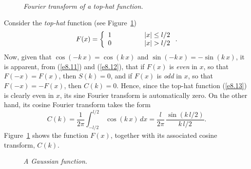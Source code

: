 \begin{figure}
\epsfysize=2.2in
\centerline{}
\caption{\em Fourier transform of a top-hat function.}\label{f8.1}   
\end{figure}

Consider the {\em top-hat}\/ function (see Figure~\ref{f8.1})
\begin{equation}\label{e8.13}
F(x)=\left\{
\begin{array}{ccc}
1 &\mbox{\hspace{1cm}}& |x|\leq l/2\\
0 && |x|>l/2
\end{array}\right..
\end{equation}
Now, given that $\cos(-k\,x)=\cos(k\,x)$ and $\sin(-k\,x)=-\sin(k\,x)$, it is
apparent, from (\ref{e8.11}) and (\ref{e8.12}), that if $F(x)$ is {\em even}\/ in $x$, so that $F(-x)=F(x)$, then $S(k)=0$, and
if $F(x)$ is {\em odd}\/ in $x$, so that $F(-x)=-F(x)$, then $C(k)=0$. Hence, since the top-hat function (\ref{e8.13})
is clearly even in $x$, its sine Fourier transform is automatically zero. On the other hand,
its cosine Fourier transform takes the form
\begin{equation}
C(k) = \frac{1}{2\pi}\int_{-l/2}^{l/2}\,\cos(k\, x)\,dx = \frac{l}{2\pi}\,\frac{\sin(k\,l/2)}{k\,l/2}.
\end{equation}
Figure~\ref{f8.1} shows the function $F(x)$, together with its associated cosine transform, $C(k)$. 

\begin{figure}
\epsfysize=2.5in
\centerline{}
\caption{\em A Gaussian function.}\label{f8.2}   
\end{figure}

